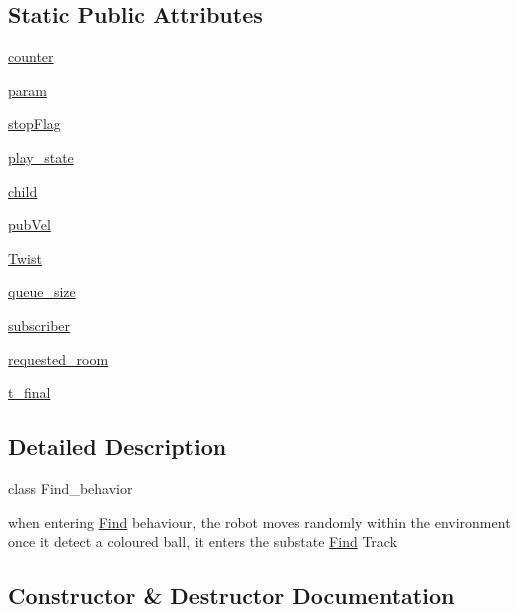 \subsection*{Static Public Attributes}
\begin{DoxyCompactItemize}
\item 
\hyperlink{classstate__machine_1_1Find_a03b9653ba644781fbeae01fea8227931}{counter}
\item 
\hyperlink{classstate__machine_1_1Find_a147a928dffe82913a947d06b1da343e4}{param}
\item 
\hyperlink{classstate__machine_1_1Find_a56c334f3d8214ea21e7caf8849e9bb63}{stop\+Flag}
\item 
\hyperlink{classstate__machine_1_1Find_a4c1e9b99c291eea6d2d77e0220cc695c}{play\+\_\+state}
\item 
\hyperlink{classstate__machine_1_1Find_a996c2a2fe2c3ff25e2aad4b87073e7c9}{child}
\item 
\hyperlink{classstate__machine_1_1Find_a39a3aa87baef536803bd7812e37ce24f}{pub\+Vel}
\item 
\hyperlink{classstate__machine_1_1Find_ad0300ceff8872223de0bc6ebf8484070}{Twist}
\item 
\hyperlink{classstate__machine_1_1Find_a264fa9455d4286aa26b670ac87d712ab}{queue\+\_\+size}
\item 
\hyperlink{classstate__machine_1_1Find_ab9bfce719b158c4f931736443eac806d}{subscriber}
\item 
\hyperlink{classstate__machine_1_1Find_ac31d8f1d8f7bee55c09c21d42ca37562}{requested\+\_\+room}
\item 
\hyperlink{classstate__machine_1_1Find_ad284228602a30b744143e35e03e938ce}{t\+\_\+final}
\end{DoxyCompactItemize}


\subsection{Detailed Description}
class Find\+\_\+behavior 

when entering \hyperlink{classstate__machine_1_1Find}{Find} behaviour, the robot moves randomly within the environment once it detect a coloured ball, it enters the substate \hyperlink{classstate__machine_1_1Find}{Find} Track 

\subsection{Constructor \& Destructor Documentation}
